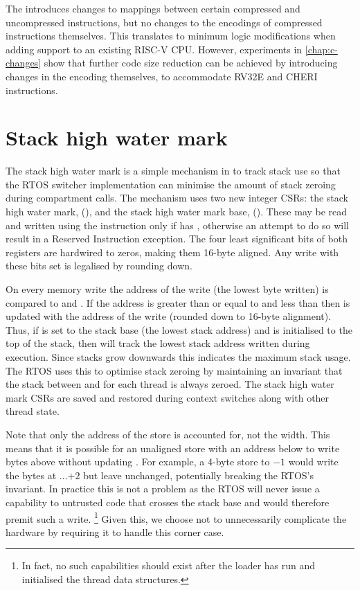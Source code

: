 The \cherimcuisa{} introduces changes to mappings between certain compressed and uncompressed instructions, but no changes to the encodings of compressed instructions themselves.
This translates to minimum logic modifications when adding \cherimcuisa{} support to an existing RISC-V CPU.
However, experiments in \cref{chap:c-changes} show that further code size reduction can be achieved by introducing changes in the encoding themselves, to accommodate RV32E and CHERI instructions.

\section{Stack high water mark}
\label{sec:shwm}

The stack high water mark is a simple mechanism in \cherimcu{} to track stack use so that the RTOS switcher implementation can minimise the amount of stack zeroing during compartment calls.
The mechanism uses two new integer CSRs: the stack high water mark, \mshwm{} (), and the stack high water mark base, \mshwmb{} ().
These may be read and written using the  instruction only if \PCC{} has \cappermASR{}, otherwise an attempt to do so will result in a Reserved Instruction exception.
The four least significant bits of both registers are hardwired to zeros, making them 16-byte aligned.
Any write with these bits set is legalised by rounding down.

On every memory write the address of the write (the lowest byte written) is compared to \mshwm{} and \mshwmb{}.
If the address is greater than or equal to \mshwmb{} and less than \mshwm{} then \mshwm{} is updated with the address of the write (rounded down to 16-byte alignment).
Thus, if \mshwmb{} is set to the stack base (the lowest stack address) and \mshwm{} is initialised to the top of the stack, then \mshwm{} will track the lowest stack address written during execution.
Since stacks grow downwards this indicates the maximum stack usage.
The RTOS uses this to optimise stack zeroing by maintaining an invariant that the stack between \mshwmb{} and \mshwm{} for each thread is always zeroed.
The stack high water mark CSRs are saved and restored during context switches along with other thread state.

Note that only the address of the store is accounted for, not the width.
This means that it is possible for an unaligned store with an address below \mshwmb{} to write bytes above \mshwmb{} without updating \mshwm{}.
For example, a 4-byte store to \mshwmb{}$ - 1$ would write the bytes at \mshwmb{}$\dots{}$\mshwmb$+ 2$ but leave \mshwm{} unchanged, potentially breaking the RTOS's invariant.
In practice this is not a problem as the RTOS will never issue a capability to untrusted code that crosses the stack base and would therefore premit such a write.%
\footnote{In fact, no such capabilities should exist after the loader has run and initialised the thread data structures.}
Given this, we choose not to unnecessarily complicate the hardware by requiring it to handle this corner case.
